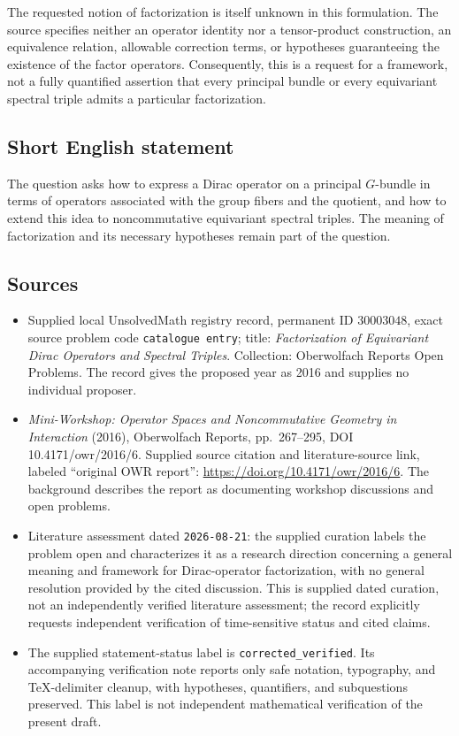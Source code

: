 \documentclass[11pt]{article}
\begin{document}
The requested notion of factorization is itself unknown in this formulation. The source specifies neither an operator identity nor a tensor-product construction, an equivalence relation, allowable correction terms, or hypotheses guaranteeing the existence of the factor operators. Consequently, this is a request for a framework, not a fully quantified assertion that every principal bundle or every equivariant spectral triple admits a particular factorization.
\subsection{Short English statement}
The question asks how to express a Dirac operator on a principal \(G\)-bundle in terms of operators associated with the group fibers and the quotient, and how to extend this idea to noncommutative equivariant spectral triples. The meaning of factorization and its necessary hypotheses remain part of the question.
\subsection{Sources}
\begin{itemize}
\item Supplied local UnsolvedMath registry record, permanent ID \(30003048\), exact source problem code \texttt{catalogue entry}; title: \emph{Factorization of Equivariant Dirac Operators and Spectral Triples}. Collection: Oberwolfach Reports Open Problems. The record gives the proposed year as 2016 and supplies no individual proposer.
\item \emph{Mini-Workshop: Operator Spaces and Noncommutative Geometry in Interaction} (2016), Oberwolfach Reports, pp.\ 267--295, DOI 10.4171/owr/2016/6. Supplied source citation and literature-source link, labeled ``original OWR report'': \url{https://doi.org/10.4171/owr/2016/6}. The background describes the report as documenting workshop discussions and open problems.
\item Literature assessment dated \texttt{2026-08-21}: the supplied curation labels the problem open and characterizes it as a research direction concerning a general meaning and framework for Dirac-operator factorization, with no general resolution provided by the cited discussion. This is supplied dated curation, not an independently verified literature assessment; the record explicitly requests independent verification of time-sensitive status and cited claims.
\item The supplied statement-status label is \texttt{corrected\_verified}. Its accompanying verification note reports only safe notation, typography, and TeX-delimiter cleanup, with hypotheses, quantifiers, and subquestions preserved. This label is not independent mathematical verification of the present draft.
\end{itemize}
\end{document}
